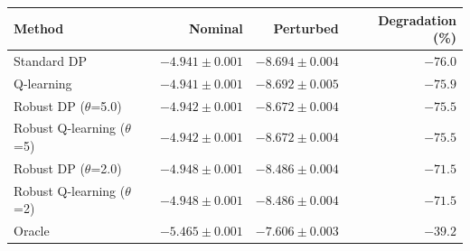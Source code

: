 \begin{tabular}{lrrr}
\hline
Method & Nominal & Perturbed & Degradation (\%) \\
\hline
Standard DP & $-4.941 \pm 0.001$ & $-8.694 \pm 0.004$ & $-76.0$ \\
Q-learning & $-4.941 \pm 0.001$ & $-8.692 \pm 0.005$ & $-75.9$ \\
Robust DP ($\theta$=5.0) & $-4.942 \pm 0.001$ & $-8.672 \pm 0.004$ & $-75.5$ \\
Robust Q-learning ($\theta$=5) & $-4.942 \pm 0.001$ & $-8.672 \pm 0.004$ & $-75.5$ \\
Robust DP ($\theta$=2.0) & $-4.948 \pm 0.001$ & $-8.486 \pm 0.004$ & $-71.5$ \\
Robust Q-learning ($\theta$=2) & $-4.948 \pm 0.001$ & $-8.486 \pm 0.004$ & $-71.5$ \\
Oracle & $-5.465 \pm 0.001$ & $-7.606 \pm 0.003$ & $-39.2$ \\
\hline
\end{tabular}